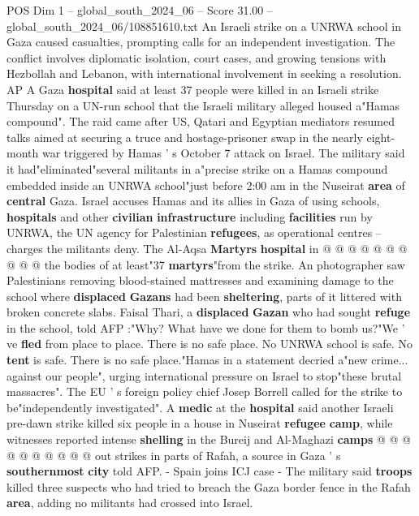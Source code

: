 \begin{textsample}{POS Dim 1 – global\_south\_2024\_06 – Score 31.00 – global\_south\_2024\_06/108851610.txt}  \label{ex:f1_pos_047}
An Israeli strike on a UNRWA school in Gaza caused casualties, prompting calls for an independent investigation.
The conflict involves diplomatic isolation, court cases, and growing tensions with Hezbollah and Lebanon, with international involvement in seeking a resolution.
AP A Gaza \textbf{hospital} said at least 37 people were killed in an Israeli strike Thursday on a UN-run school that the Israeli military alleged housed a"Hamas compound".
The raid came after US, Qatari and Egyptian mediators resumed talks aimed at securing a truce and hostage-prisoner swap in the nearly eight-month war triggered by Hamas ' s October 7 attack on Israel.
The military said it had"eliminated"several militants in a"precise strike on a Hamas compound embedded inside an UNRWA school"just before 2:00 am in the Nuseirat \textbf{area} of \textbf{central} Gaza.
Israel accuses Hamas and its allies in Gaza of using schools, \textbf{hospitals} and other \textbf{civilian} \textbf{infrastructure} including \textbf{facilities} run by UNRWA, the UN agency for Palestinian \textbf{refugees}, as operational centres -- charges the militants deny.
The Al-Aqsa \textbf{Martyrs} \textbf{hospital} in @ @ @ @ @ @ @ @ @ @ the bodies of at least"37 \textbf{martyrs}"from the strike.
An photographer saw Palestinians removing blood-stained mattresses and examining damage to the school where \textbf{displaced} \textbf{Gazans} had been \textbf{sheltering}, parts of it littered with broken concrete slabs.
Faisal Thari, a \textbf{displaced} \textbf{Gazan} who had sought \textbf{refuge} in the school, told AFP :"Why?
What have we done for them to bomb us?"We ' ve \textbf{fled} from place to place.
There is no safe place.
No UNRWA school is safe.
No \textbf{tent} is safe.
There is no safe place."Hamas in a statement decried a"new crime... against our people", urging international pressure on Israel to stop"these brutal massacres".
The EU ' s foreign policy chief Josep Borrell called for the strike to be"independently investigated".
A \textbf{medic} at the \textbf{hospital} said another Israeli pre-dawn strike killed six people in a house in Nuseirat \textbf{refugee} \textbf{camp}, while witnesses reported intense \textbf{shelling} in the Bureij and Al-Maghazi \textbf{camps} @ @ @ @ @ @ @ @ @ @ out strikes in parts of Rafah, a source in Gaza ' s \textbf{southernmost} \textbf{city} told AFP. - Spain joins ICJ case - The military said \textbf{troops} killed three suspects who had tried to breach the Gaza border fence in the Rafah \textbf{area}, adding no militants had crossed into Israel.

\end{textsample}
